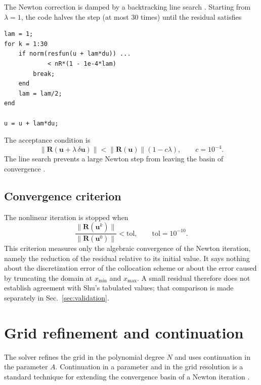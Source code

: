 \documentclass[11pt,a4paper]{article}
\begin{document}
The Newton correction is damped by a backtracking line search
\cite{armijo1966}. Starting from $\lambda=1$, the code halves
the step (at most 30 times) until the residual satisfies
\begin{lstlisting}[style=matlab]
lam = 1;
for k = 1:30
    if norm(resfun(u + lam*du)) ...
            < nR*(1 - 1e-4*lam)
        break;
    end
    lam = lam/2;
end

u = u + lam*du;
\end{lstlisting}
The acceptance condition is
\begin{equation}
\|\mathbf R(\mathbf u+\lambda\,\delta\mathbf u)\|
<
\|\mathbf R(\mathbf u)\|\left(1-c\lambda\right),
\qquad
c=10^{-4}.
\label{eq:armijo}
\end{equation}
The line search prevents a large Newton step from leaving the basin of
convergence \cite{armijo1966}.

\subsection{Convergence criterion}

The nonlinear iteration is stopped when
\begin{equation}
\frac{\|\mathbf R(\mathbf u^k)\|}{\|\mathbf R(\mathbf u^0)\|}
<
\mathrm{tol},
\qquad
\mathrm{tol}=10^{-10}.
\label{eq:tol}
\end{equation}
This criterion measures only the algebraic convergence of the Newton
iteration, namely the reduction of the residual relative to its initial
value. It says nothing about the discretization error of the collocation
scheme or about the error caused by truncating the domain at $x_{\min}$
and $x_{\max}$. A small residual therefore does not establish agreement
with Shu's tabulated values; that comparison is made separately in
Sec.~\ref{sec:validation}.

\section{Grid refinement and continuation}
\label{sec:cont}

The solver refines the grid in the polynomial degree $N$ and uses
continuation in the parameter $A$. Continuation in a parameter and in the
grid resolution is a standard technique for extending the convergence
basin of a Newton iteration \cite{dennis1996,allgower1990}.
\end{document}
